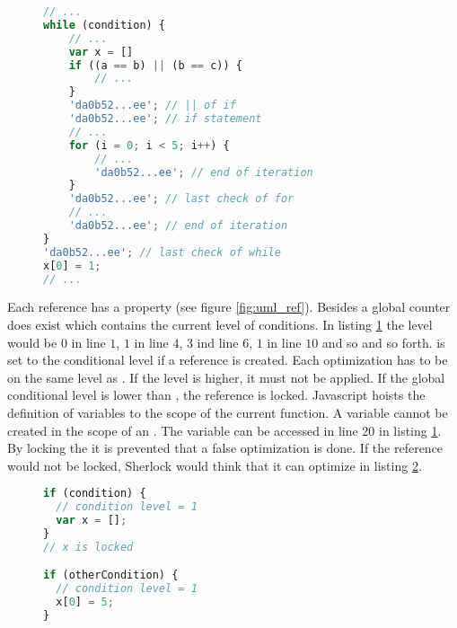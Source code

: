 \begin{figure}[htbp]
\begin{lstlisting}[language=Javascript]
// ...
while (condition) {
    // ...
    var x = []
    if ((a == b) || (b == c)) {
        // ...
    }
    'da0b52...ee'; // || of if
    'da0b52...ee'; // if statement
    // ...
    for (i = 0; i < 5; i++) {
        // ...
        'da0b52...ee'; // end of iteration
    }
    'da0b52...ee'; // last check of for
    // ...
    'da0b52...ee'; // end of iteration
}
'da0b52...ee'; // last check of while
x[0] = 1;
// ...
\end{lstlisting}
\caption{}\label{fig:example_cond_instrum}
\end{figure}

Each reference has a  property (see figure \ref{fig:uml_ref}). Besides a global counter does exist which contains the current level of conditions. In listing \ref{fig:example_cond_instrum} the level would be $0$ in line $1$, $1$ in line $4$, $3$ ind line $6$, $1$ in line $10$ and so and so forth.  is set to the conditional level if a reference is created. Each optimization has to be on the same level as . If the level is higher, it must not be applied. If the global conditional level is lower than , the reference is locked. Javascript hoists the definition of variables to the scope of the current function. A variable cannot be created in the scope of an . The variable  can be accessed in line 20 in listing \ref{fig:example_cond_instrum}. By locking the  it is prevented that a false optimization is done. If the reference would not be locked, Sherlock would think that it can optimize  in listing \ref{fig:example_cond_instrum_2}.

\begin{figure}[htbp]
\begin{lstlisting}[language=Javascript]
if (condition) {
  // condition level = 1
  var x = [];
}
// x is locked

if (otherCondition) {
  // condition level = 1
  x[0] = 5;
}
\end{lstlisting}
\caption{}\label{fig:example_cond_instrum_2}
\end{figure}




